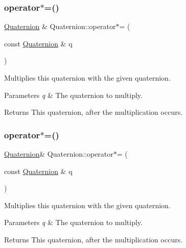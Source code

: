 \subsubsection{\texorpdfstring{operator$\ast$=()}{operator*=()}\hspace{0.1cm}{\footnotesize\ttfamily [1/2]}}
{\footnotesize\ttfamily \hyperlink{classQuaternion}{Quaternion} \& Quaternion\+::operator$\ast$= (\begin{DoxyParamCaption}\item[{const \hyperlink{classQuaternion}{Quaternion} \&}]{q }\end{DoxyParamCaption})\hspace{0.3cm}{\ttfamily [inline]}}

Multiplies this quaternion with the given quaternion.


\begin{DoxyParams}{Parameters}
{\em q} & The quaternion to multiply. \\
\hline
\end{DoxyParams}
\begin{DoxyReturn}{Returns}
This quaternion, after the multiplication occurs. 
\end{DoxyReturn}
\mbox{\label{classQuaternion_ae897d8ee92c5ac1f7cfd534170eb521c}} 
\subsubsection{\texorpdfstring{operator$\ast$=()}{operator*=()}\hspace{0.1cm}{\footnotesize\ttfamily [2/2]}}
{\footnotesize\ttfamily \hyperlink{classQuaternion}{Quaternion}\& Quaternion\+::operator$\ast$= (\begin{DoxyParamCaption}\item[{const \hyperlink{classQuaternion}{Quaternion} \&}]{q }\end{DoxyParamCaption})\hspace{0.3cm}{\ttfamily [inline]}}

Multiplies this quaternion with the given quaternion.


\begin{DoxyParams}{Parameters}
{\em q} & The quaternion to multiply. \\
\hline
\end{DoxyParams}
\begin{DoxyReturn}{Returns}
This quaternion, after the multiplication occurs. 
\end{DoxyReturn}
\mbox{\label{classQuaternion_a435e47a2efca1a6c39f1835678437104}} 
